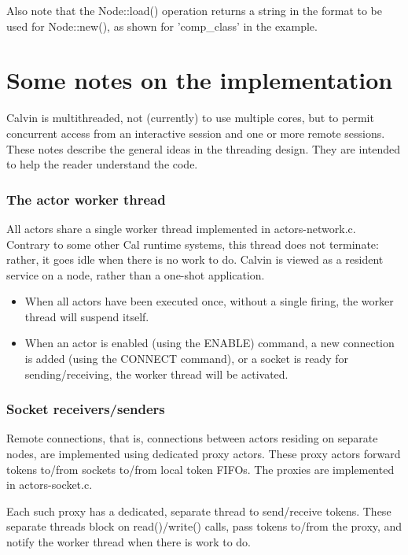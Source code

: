 \documentclass[10pt, a4paper]{article}
\begin{document}
Also note that the Node::load() operation returns a string in the
format to be used for Node::new(), as shown for 'comp\_class' in the
example.

\section{Some notes on the implementation}

Calvin is multithreaded, not (currently) to use multiple cores, but to
permit concurrent access from an interactive session and one or more
remote sessions. These notes describe the general ideas in the
threading design. They are intended to help the reader understand the code.

\subsubsection*{The actor worker thread}

All actors share a single worker thread implemented in actors-network.c. Contrary to some other Cal runtime systems, this thread does not terminate: rather, it goes idle when there is no work to do. Calvin is viewed as a resident service on a node, rather than a one-shot application.

\begin{itemize}
\item When all actors have been executed once, without a single
  firing, the worker thread will suspend itself.
\item When an actor is enabled (using the ENABLE) command, a new
  connection is added (using the CONNECT command), or a socket is
  ready for sending/receiving, the worker thread will be activated.
\end{itemize}

\subsubsection*{Socket receivers/senders}

Remote connections, that is, connections between actors residing on
separate nodes, are implemented using dedicated proxy actors. These
proxy actors forward tokens to/from sockets to/from local token
FIFOs. The proxies are implemented in actors-socket.c.

Each such proxy has a dedicated, separate thread to send/receive
tokens. These separate threads block on read()/write() calls, pass
tokens to/from the proxy, and notify the worker thread when there is
work to do.
\end{document}
